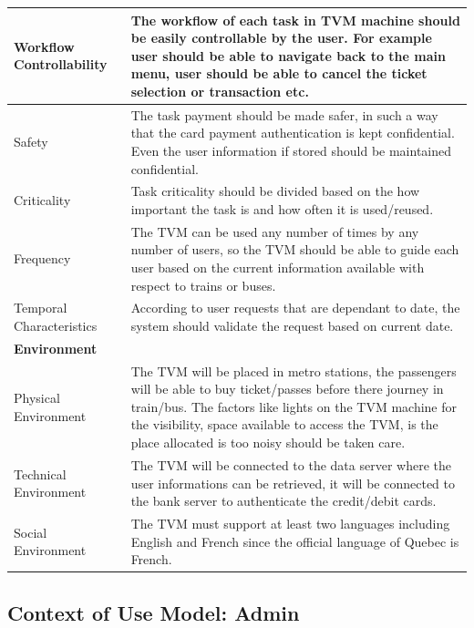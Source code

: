 \documentclass[a4paper,12pt]{report}
\begin{document}
\setlength{\tabcolsep}{18pt}
\renewcommand{\arraystretch}{1.5}
\begin{tabular}[H]{ |p{3cm}|p{12cm}| }
	\hline
	Workflow Controllability & The workflow of each task in TVM machine should be easily controllable by the user. For example user should be able to navigate back to the main menu, user should be able to cancel the ticket selection or transaction etc.\\
	\hline
	Safety & 
	The task payment should be made safer, in such a way that the card payment authentication is kept confidential. Even the user information if stored should be maintained confidential.\\
	\hline
	Criticality & 
	Task criticality should be divided based on the how important the task is and how often it is used/reused.\\
	\hline
	Frequency & 
	The TVM can be used any number of times by any number of users, so the TVM should be able to guide each user based on the current information available with respect to trains or buses.\\
	\hline
	Temporal Characteristics & 
	According to user requests that are dependant to date, the system should validate the request based on current date. \\
	\hline
	\textbf{Environment} & \\
	\hline
	Physical Environment & 
	The TVM will be placed in metro stations, the passengers will be able to buy ticket/passes before there journey in train/bus. The factors like lights on the TVM machine for the visibility, space available to access the TVM, is the place allocated is too noisy should be taken care. \\
	\hline
	Technical Environment & 
	The TVM will be connected to the data server where the user informations can be retrieved, it will be connected to the bank server to authenticate the credit/debit cards. \\
	\hline
	Social Environment & 
	The TVM must support at least two languages including English and French since the official language of Quebec is French. \\
	\hline
\end{tabular}





\subsection{Context of Use Model: Admin}
\end{document}
